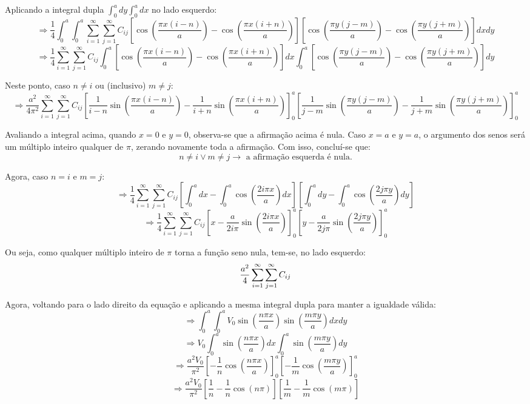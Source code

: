 \documentclass{report}
\begin{document}
Aplicando a integral dupla $ \int_{0}^{a}dy\int_{0}^{a}dx $ no lado esquerdo:
$$ \textstyle \Rightarrow \frac{1}{4}\int_{0}^{a}\int_{0}^{a}\sum_{i=1}^{\infty} \sum_{j=1}^{\infty} C_{ij}\left[\cos\left(\frac{\pi x(i - n)}{a}\right) - \cos\left(\frac{\pi x(i + n)}{a}\right)\right]\left[\cos\left(\frac{\pi y(j - m)}{a}\right) - \cos\left(\frac{\pi y(j + m)}{a}\right)\right]dxdy $$
$$ \textstyle \Rightarrow \frac{1}{4} \sum_{i=1}^{\infty} \sum_{j=1}^{\infty} C_{ij} \int_{0}^{a} \left[\cos\left(\frac{\pi x(i - n)}{a}\right) - \cos\left(\frac{\pi x(i + n)}{a}\right)\right]dx\int_{0}^{a}\left[\cos\left(\frac{\pi y(j - m)}{a}\right) - \cos\left(\frac{\pi y(j + m)}{a}\right)\right]dy $$

Neste ponto, caso $ n \neq i $ ou (inclusivo) $ m \neq j $:
$$ \scriptstyle \Rightarrow \frac{a^2}{4\pi^2} \sum_{i=1}^{\infty} \sum_{j=1}^{\infty} C_{ij} \left[\frac{1}{i - n}\sin\left(\frac{\pi x(i - n)}{a}\right) - \frac{1}{i + n}\sin\left(\frac{\pi x(i + n)}{a}\right)\right]_{0}^{a} \left[\frac{1}{j - m}\sin\left(\frac{\pi y(j - m)}{a}\right) - \frac{1}{j + m}\sin\left(\frac{\pi y(j + m)}{a}\right)\right]_{0}^{a} $$

Avaliando a integral acima, quando $ x = 0 $ e $ y = 0 $, observa-se que a afirmação acima é nula. Caso $ x = a $ e $ y = a $, o argumento dos senos será um múltiplo inteiro qualquer de $ \pi $, zerando novamente toda a afirmação. Com isso, concluí-se que:
$$ n \neq i \lor m \neq j \rightarrow \text{ a afirmação esquerda é nula.} $$

Agora, caso $ n = i $ e $ m = j $:
$$ \Rightarrow \frac{1}{4} \sum_{i=1}^{\infty} \sum_{j=1}^{\infty} C_{ij} \left[\int_{0}^{a}dx - \int_{0}^{a}\cos\left(\frac{2i\pi x}{a}\right)dx\right]\left[\int_{0}^{a}dy - \int_{0}^{a}\cos\left(\frac{2j\pi y}{a}\right)dy\right] $$
$$ \Rightarrow \frac{1}{4} \sum_{i=1}^{\infty} \sum_{j=1}^{\infty} C_{ij} \left[x - \frac{a}{2i\pi}\sin\left(\frac{2i\pi x}{a}\right)\right]_{0}^{a}\left[y - \frac{a}{2j\pi}\sin\left(\frac{2j\pi y}{a}\right)\right]_{0}^{a} $$

Ou seja, como qualquer múltiplo inteiro de $ \pi $ torna a função seno nula, tem-se, no lado esquerdo:
\begin{equation}
  \label{eq:Cij_left}
  \centering
  \frac{a^2}{4} \sum_{i=1}^{\infty} \sum_{j=1}^{\infty} C_{ij}
\end{equation}

Agora, voltando para o lado direito da equação e aplicando a mesma integral dupla para manter a igualdade válida:
$$ \Rightarrow \int_{0}^{a} \int_{0}^{a} V_0\sin\left(\frac{n\pi x}{a}\right)\sin\left(\frac{m\pi y}{a}\right)dxdy $$
$$ \Rightarrow V_0 \int_{0}^{a} \sin\left(\frac{n\pi x}{a}\right)dx \int_{0}^{a} \sin\left(\frac{m\pi y}{a}\right)dy $$
$$ \Rightarrow \frac{a^2V_0}{\pi^2} \left[-\frac{1}{n}\cos\left(\frac{n\pi x}{a}\right)\right]_{0}^{a} \left[-\frac{1}{m}\cos\left(\frac{m\pi y}{a}\right)\right]_{0}^{a} $$
$$ \Rightarrow \frac{a^2V_0}{\pi^2} \left[\frac{1}{n} - \frac{1}{n}\cos\left(n\pi\right)\right] \left[\frac{1}{m} - \frac{1}{m}\cos\left(m\pi\right)\right] $$
\end{document}
